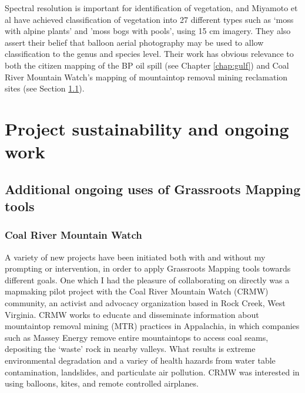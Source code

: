 \documentclass[11pt]{report}
\begin{document}

Spectral resolution is important for identification of vegetation, and Miyamoto et al have achieved classification of vegetation into 27 different types such as `moss with alpine plants' and 'moss bogs with pools', using 15 cm imagery. They also assert their belief that balloon aerial photography may be used to allow classification to the genus and species level. \cite{miyamoto2004use} Their work has obvious relevance to both the citizen mapping of the BP oil spill (see Chapter \ref{chap:gulf}) and Coal River Mountain Watch's mapping of mountaintop removal mining reclamation sites (see Section \ref{sec:ongoinguses}).

\chapter{Project sustainability and ongoing work}

\section{Additional ongoing uses of Grassroots Mapping tools}
\label{sec:ongoinguses}
\subsection{Coal River Mountain Watch}

A variety of new projects have been initiated both with and without my prompting or intervention, in order to apply Grassroots Mapping tools towards different goals. One which I had the pleasure of collaborating on directly was a mapmaking pilot project with the Coal River Mountain Watch (CRMW) community, an activist and advocacy organization based in Rock Creek, West Virginia. CRMW works to educate and disseminate information about mountaintop removal mining (MTR) practices in Appalachia, in which companies such as Massey Energy remove entire mountaintops to access coal seams, depositing the `waste' rock in nearby valleys. What results is extreme environmental degradation and a variey of health hazards from water table contamination, landslides, and particulate air pollution. CRMW was interested in using balloons, kites, and remote controlled airplanes. 

\end{document}
